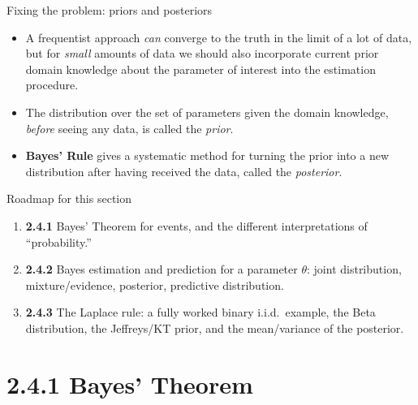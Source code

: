 \documentclass[aspectratio=169,10pt]{beamer}
\begin{document}
\begin{frame}{Fixing the problem: priors and posteriors}
  \begin{itemize}
    \item A frequentist approach \emph{can} converge to the truth in the
      limit of a lot of data, but for \emph{small} amounts of data we should
      also incorporate current prior domain knowledge about the parameter of
      interest into the estimation procedure.
    \item The distribution over the set of parameters given the domain
      knowledge, \emph{before} seeing any data, is called the \emph{prior}.
    \item \textbf{Bayes' Rule} gives a systematic method for turning the
      prior into a new distribution after having received the data, called
      the \emph{posterior}.
  \end{itemize}

  \begin{block}{Roadmap for this section}
    \begin{enumerate}
      \item \textbf{2.4.1} Bayes' Theorem for events, and the different
        interpretations of ``probability.''
      \item \textbf{2.4.2} Bayes estimation and prediction for a parameter
        $\theta$: joint distribution, mixture/evidence, posterior,
        predictive distribution.
      \item \textbf{2.4.3} The Laplace rule: a fully worked binary i.i.d.\
        example, the Beta distribution, the Jeffreys/KT prior, and the
        mean/variance of the posterior.
    \end{enumerate}
  \end{block}
\end{frame}

\section{2.4.1 Bayes' Theorem}
\end{document}
